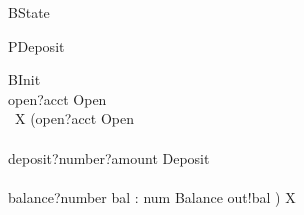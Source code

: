 \begin{circusaction}
\circstate BState\\
\end{circusaction}

\begin{circusaction}
\ohcircprivate PDeposit
\end{circusaction}


\begin{circusaction}
\circspot BInit \circseq\\
open?acct \then Open \circseq \\
\circmu~X \circspot (open?acct \then Open\\
\extchoice\\
deposit?number?amount \then Deposit\\
\extchoice\\
balance?number \then \circvar bal : num \circspot Balance \circseq out!bal \then \Skip) \circseq X
\end{circusaction}

\begin{circus}
\circend
\end{circus}
